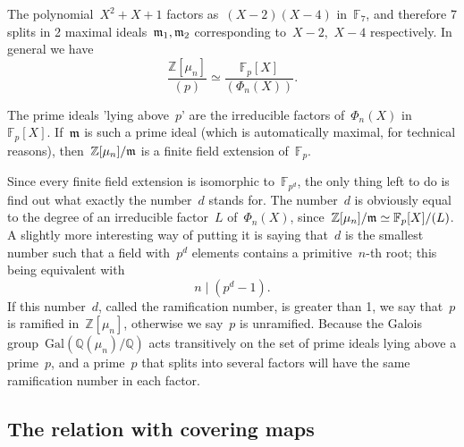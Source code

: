 The polynomial~${X^2 + X + 1}$ factors as~${(X-2)(X-4)}$ in~${\mathbb{F}_7}$, and therefore 7 splits in 2 maximal ideals~${\frak{m}_1, \frak{m}_2}$ corresponding to~${X-2}$,~${X-4}$ respectively. In general we have
\begin{equation}
  \frac{\mathbb{Z}[\mu_n]}{(p)} \simeq \frac{\mathbb{F}_p[X]}{(\Phi_n(X))}.
\end{equation}

The prime ideals 'lying above~${p}$' are the irreducible factors of~${\Phi_n(X)}$ in~${\mathbb{F}_p[X]}$. If~${\frak{m}}$ is such a prime ideal (which is automatically maximal, for technical reasons), then~${\mathbb{Z}[\mu_n]/\frak{m}}$ is a finite field extension of~${\mathbb{F}_p}$.

Since every finite field extension is isomorphic to~${\mathbb{F}_{p^d}}$, the only thing left to do is find out what exactly the number~${d}$ stands for. The number~${d}$ is obviously equal to the degree of an irreducible factor~${L}$ of~${\Phi_n(X)}$, since~${\mathbb{Z}[\mu_n]/\frak{m}\simeq \mathbb{F}_p[X]/(L)}$. A slightly more interesting way of putting it is saying that~${d}$ is the smallest number such that a field with~${p^d}$ elements contains a primitive~${n}$-th root; this being equivalent with
\begin{equation}
  n \mid (p^d - 1) .
\end{equation}
If this number~${d}$, called the ramification number, is greater than 1, we say that~${p}$ is ramified in~${\mathbb{Z}[\mu_n]}$, otherwise we say~${p}$ is unramified. Because the Galois group~${\mathrm{Gal}(\mathbb{Q}(\mu_n) / \mathbb{Q})}$ acts transitively on the set of prime ideals lying above a prime~${p}$, and a prime~${p}$ that splits into several factors will have the same ramification number in each factor.

\subsection{The relation with covering maps}

